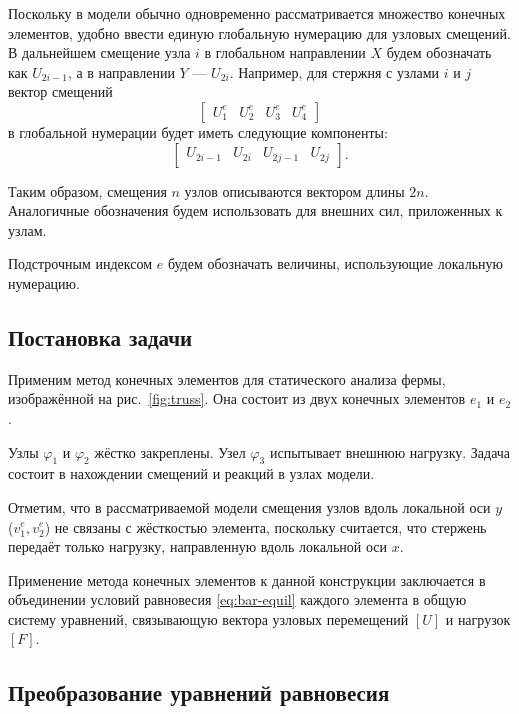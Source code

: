 \documentclass[10pt]{article}
\numberwithin{equation}{section}
\renewcommand{\phi}{\varphi}
\newcommand{\matr}[1]{[#1]}
\newcommand{\figref}[1]{рис. \ref{#1}}
\newcommand{\node}[1]{$\phi_{#1}$}
\newcommand{\element}[1]{$e_{#1}$}
\begin{document}
Поскольку в модели обычно одновременно рассматривается множество
конечных элементов, удобно ввести единую глобальную нумерацию для
узловых смещений. В дальнейшем смещение узла $i$ в глобальном
направлении $X$ будем обозначать как $U_{2i-1}$, а в направлении $Y$ —
$U_{2i}$. Например, для стержня с узлами $i$ и $j$ вектор смещений
\begin{equation*}
    \begin{bmatrix}
    U_1^e & U_2^e & U_3^e & U_4^e
  \end{bmatrix}
\end{equation*}
в глобальной нумерации будет иметь следующие компоненты:
\begin{equation}
  \label{eq:global-numbering}
  \begin{bmatrix}
    U_{2i-1} & U_{2i} & U_{2j-1} & U_{2j}
  \end{bmatrix}.
\end{equation}
 
Таким образом, смещения $n$ узлов описываются вектором длины $2n$.
Аналогичные обозначения будем использовать для внешних сил,
приложенных к узлам.

Подстрочным индексом $e$ будем обозначать величины, использующие локальную
нумерацию.

\subsection{Постановка задачи}

Применим метод конечных элементов для статического анализа фермы,
изображённой на \figref{fig:truss}. Она состоит из двух конечных
элементов \element{1} и \element{2}.



Узлы \node{1} и \node{2} жёстко закреплены. Узел \node{3} испытывает
внешнюю нагрузку. Задача состоит в нахождении смещений и реакций в
узлах модели.

Отметим, что в рассматриваемой модели смещения узлов вдоль локальной
оси $y$ ($v_1^e, v_2^e$) не связаны с жёсткостью элемента, поскольку
считается, что стержень передаёт только нагрузку, направленную вдоль
локальной оси $x$.

Применение метода конечных элементов к данной конструкции заключается
в объединении условий равновесия \eqref{eq:bar-equil} каждого элемента
в общую систему уравнений, связывающую вектора узловых перемещений
$\matr{U}$ и нагрузок $\matr{F}$.

\subsection{Преобразование уравнений равновесия}
\end{document}
